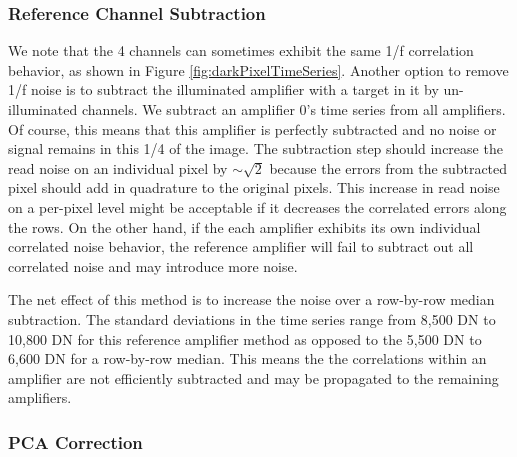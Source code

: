 \documentclass{aastex62}
\begin{document}
\subsubsection{Reference Channel Subtraction}
We note that the 4 channels can sometimes exhibit the same 1/f correlation behavior, as shown in Figure \ref{fig:darkPixelTimeSeries}.
Another option to remove 1/f noise is to subtract the illuminated amplifier with a target in it by un-illuminated channels.
We subtract an amplifier 0's time series from all amplifiers.
Of course, this means that this amplifier is perfectly subtracted and no noise or signal remains in this 1/4 of the image.
The subtraction step should increase the read noise on an individual pixel by $\sim \sqrt{2}$ because the errors from the subtracted pixel should add in quadrature to the original pixels.
This increase in read noise on a per-pixel level might be acceptable if it decreases the correlated errors along the rows.
On the other hand, if the each amplifier exhibits its own individual correlated noise behavior, the reference amplifier will fail to subtract out all correlated noise and may introduce more noise.

The net effect of this method is to increase the noise over a row-by-row median subtraction.
The standard deviations in the time series range from 8,500 DN to 10,800 DN for this reference amplifier method as opposed to the 5,500 DN to 6,600 DN for a row-by-row median.
This means the the correlations within an amplifier are not efficiently subtracted and may be propagated to the remaining amplifiers.


\subsubsection{PCA Correction}
\end{document}
